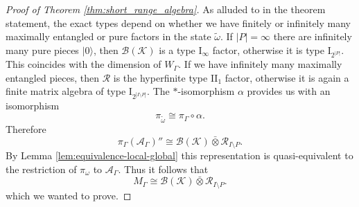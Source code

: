 \documentclass[aps,pra,reprint,superscriptaddress]{revtex4-2}
\newcommand{\cA}{{\mathcal A}}
\newcommand{\cB}{{\mathcal B}}
\newcommand{\cK}{{\mathcal K}}
\newcommand{\cR}{{\mathcal R}}
\newcommand\G{\Gamma}
\newcommand\w{\omega}
\providecommand{\ket}[1]{\lvert #1\rangle}
\theoremstyle{definition}
\theoremstyle{remark}
\begin{document}
\begin{proof}[Proof of Theorem \ref{thm:short_range_algebra}]
    As alluded to in the theorem statement, the exact types depend on whether we have finitely or infinitely many maximally
    entangled or pure factors in the state $\tilde{\w}$. If $|P| = \infty$ there are
    infinitely many pure pieces $\ket{0}$, then $\cB(\cK)$ is a type I$_\infty$ factor,
    otherwise it is type I$_{2^{|P|}}$.
    This coincides with the dimension of $W_\G$. If we have infinitely many
    maximally entangled pieces, then $\cR$ is the hyperfinite type II$_1$
    factor, otherwise it is again a finite matrix algebra of type I$_{2^{|I\setminus P|}}$. The $\ast$-isomorphism $\alpha$ provides us with an isomorphism 
    \begin{equation}
        \pi_{\tilde{\w}} \cong \pi_{\G} \circ  \alpha.
    \end{equation}
    Therefore 
    \begin{equation}
        \pi_\G(\cA_\G)'' \cong \cB(\cK) \bar{\otimes} \cR_{I\setminus P}.
    \end{equation}
    By Lemma \ref{lem:equivalence-local-global} this representation is quasi-equivalent to the restriction of $\pi_\w$ to $\cA_\G$. Thus it follows that 
    \begin{equation}
        M_\G \cong \cB(\cK) \bar{\otimes} \cR_{I\setminus P}.
    \end{equation}
    which we wanted to prove.
\end{proof}
\end{document}
